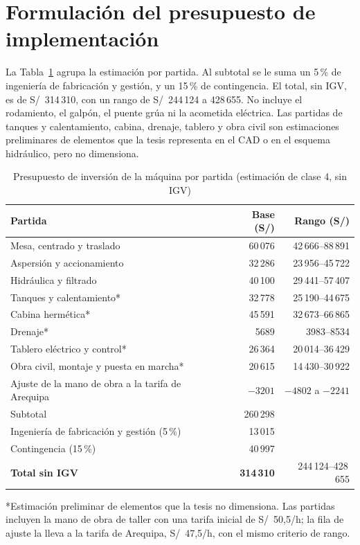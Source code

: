 \section{Formulación del presupuesto de implementación}

La Tabla~\ref{tab:presupuesto-completo} agrupa la estimación por partida. Al subtotal se le suma un 5\,\% de ingeniería de fabricación y gestión, y un 15\,\% de contingencia. El total, sin IGV, es de S/~314\,310, con un rango de S/~244\,124 a 428\,655. No incluye el rodamiento, el galpón, el puente grúa ni la acometida eléctrica. Las partidas de tanques y calentamiento, cabina, drenaje, tablero y obra civil son estimaciones preliminares de elementos que la tesis representa en el CAD o en el esquema hidráulico, pero no dimensiona.

\begin{table}[htbp]
\centering\small\singlespacing
\caption{Presupuesto de inversión de la máquina por partida (estimación de clase 4, sin IGV)}
\label{tab:presupuesto-completo}
\begin{tabular}{@{}lrr@{}}
\toprule
\textbf{Partida} & \textbf{Base (S/)} & \textbf{Rango (S/)}\\
\midrule
Mesa, centrado y traslado & 60\,076 & 42\,666--88\,891\\
Aspersión y accionamiento & 32\,286 & 23\,956--45\,722\\
Hidráulica y filtrado & 40\,100 & 29\,441--57\,407\\
Tanques y calentamiento* & 32\,778 & 25\,190--44\,675\\
Cabina hermética* & 45\,591 & 32\,673--66\,865\\
Drenaje* & 5689 & 3983--8534\\
Tablero eléctrico y control* & 26\,364 & 20\,014--36\,429\\
Obra civil, montaje y puesta en marcha* & 20\,615 & 14\,430--30\,922\\
Ajuste de la mano de obra a la tarifa de Arequipa & $-3201$ & $-4802$ a $-2241$\\
\midrule
Subtotal & 260\,298 & \\
Ingeniería de fabricación y gestión (5\,\%) & 13\,015 & \\
Contingencia (15\,\%) & 40\,997 & \\
\textbf{Total sin IGV} & \textbf{314\,310} & 244\,124--428\,655\\
\bottomrule
\end{tabular}
\par\smallskip\footnotesize
*Estimación preliminar de elementos que la tesis no dimensiona. Las partidas incluyen la mano de obra de taller con una tarifa inicial de S/~50,5/h; la fila de ajuste la lleva a la tarifa de Arequipa, S/~47,5/h, con el mismo criterio de rango.
\end{table}

